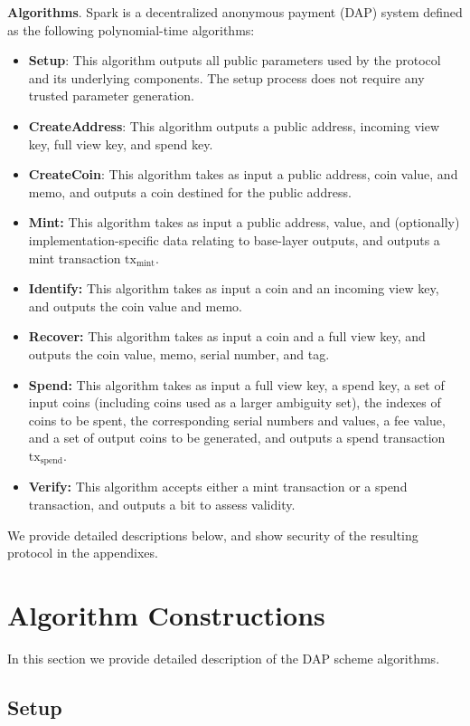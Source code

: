 \documentclass{llncs}
\begin{document}
\textbf{Algorithms}. Spark is a decentralized anonymous payment (DAP) system defined as the following polynomial-time algorithms:
\begin{itemize}
\item \textbf{Setup}: This algorithm outputs all public parameters used by the protocol and its underlying components.
The setup process does not require any trusted parameter generation.
\item \textbf{CreateAddress}: This algorithm outputs a public address, incoming view key, full view key, and spend key.
\item \textbf{CreateCoin}: This algorithm takes as input a public address, coin value, and memo, and outputs a coin destined for the public address.
\item \textbf{Mint:} This algorithm takes as input a public address, value, and (optionally) implementation-specific data relating to base-layer outputs, and outputs a mint transaction $\text{tx}_{\text{mint}}$.
\item \textbf{Identify:} This algorithm takes as input a coin and an incoming view key, and outputs the coin value and memo.
\item \textbf{Recover:} This algorithm takes as input a coin and a full view key, and outputs the coin value, memo, serial number, and tag.
\item \textbf{Spend:} This algorithm takes as input a full view key, a spend key, a set of input coins (including coins used as a larger ambiguity set), the indexes of coins to be spent, the corresponding serial numbers and values, a fee value, and a set of output coins to be generated, and outputs a spend transaction $\text{tx}_{\text{spend}}$.
\item \textbf{Verify:} This algorithm accepts either a mint transaction or a spend transaction, and outputs a bit to assess validity.
\end{itemize}

We provide detailed descriptions below, and show security of the resulting protocol in the appendixes.


\section{Algorithm Constructions}

In this section we provide detailed description of the DAP scheme algorithms.


\subsection{Setup}
\end{document}
